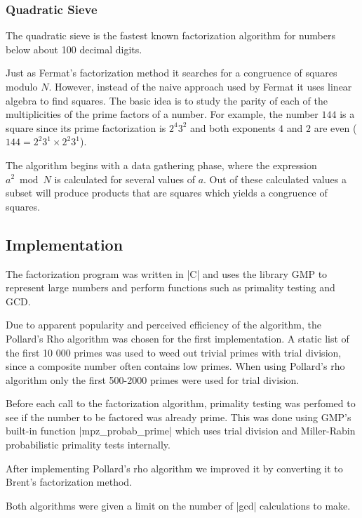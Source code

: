 \documentclass[paper=a4, fontsize=11pt,numbers=endperiod]{scrartcl} %
\numberwithin{equation}{section} %
\numberwithin{figure}{section} %
\numberwithin{table}{section} %
\begin{document}
\subsubsection{Quadratic Sieve}
The quadratic sieve \cite{qsieve} is the fastest known factorization algorithm for numbers below about 100 decimal digits\cite{qsieve2}. 

Just as Fermat's factorization method it searches for a congruence of squares modulo $N$.
However, instead of the naive approach used by Fermat it uses linear algebra to find squares.
The basic idea is to study the parity of each of the multiplicities of the prime factors of a number.
For example, the number $144$ is a square since its prime factorization is $2^{4}3^2$ and both exponents $4$ and $2$ are even ($144 = 2^2 3^1\times2^2 3^1$).

The algorithm begins with a data gathering phase, where the expression $a^2 \bmod N$ is calculated for several values of $a$.
Out of these calculated values a subset will produce products that are squares which yields a congruence of squares.

\subsection{Implementation}
The factorization program was written in |C| and uses the library GMP \cite{gmp} to represent large numbers and perform functions such as primality testing and GCD.

Due to apparent popularity and perceived efficiency of the algorithm, the Pollard's Rho algorithm was chosen for the first implementation.
A static list of the first 10 000 primes was used to weed out trivial primes with trial division, since a composite number often contains low primes.
When using Pollard's rho algorithm only the first 500-2000 primes were used for trial division.

Before each call to the factorization algorithm, primality testing was perfomed to see if the number to be factored was already prime.
This was done using GMP's built-in function |mpz_probab_prime| which uses trial division and Miller-Rabin probabilistic primality tests internally. \cite{probabprime}


After implementing Pollard's rho algorithm we improved it by converting it to Brent's factorization method.

Both algorithms were given a limit on the number of |gcd| calculations to make.
\end{document}
